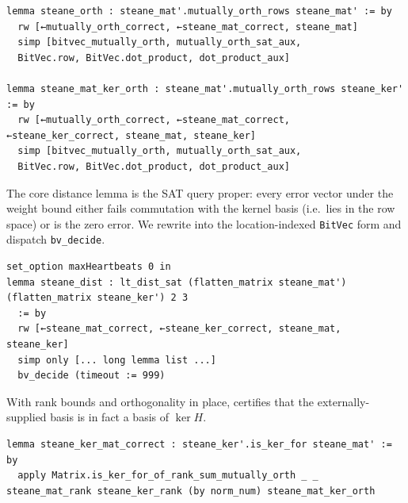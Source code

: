 \begin{lstlisting}
lemma steane_orth : steane_mat'.mutually_orth_rows steane_mat' := by
  rw [←mutually_orth_correct, ←steane_mat_correct, steane_mat]
  simp [bitvec_mutually_orth, mutually_orth_sat_aux,
  BitVec.row, BitVec.dot_product, dot_product_aux]

lemma steane_mat_ker_orth : steane_mat'.mutually_orth_rows steane_ker' := by
  rw [←mutually_orth_correct, ←steane_mat_correct, ←steane_ker_correct, steane_mat, steane_ker]
  simp [bitvec_mutually_orth, mutually_orth_sat_aux,
  BitVec.row, BitVec.dot_product, dot_product_aux]
\end{lstlisting}

%

The core distance lemma is the SAT query proper: every error vector under the
weight bound either fails commutation with the kernel basis (i.e.\ lies in the
row space) or is the zero error. We rewrite into the location-indexed
\lstinline{BitVec} form and dispatch \lstinline{bv_decide}.

\begin{lstlisting}
set_option maxHeartbeats 0 in
lemma steane_dist : lt_dist_sat (flatten_matrix steane_mat') (flatten_matrix steane_ker') 2 3
  := by
  rw [←steane_mat_correct, ←steane_ker_correct, steane_mat, steane_ker]
  simp only [... long lemma list ...]
  bv_decide (timeout := 999)
\end{lstlisting}

%

With rank bounds and orthogonality in place,  certifies that the
externally-supplied basis is in fact a basis of $\ker H$.

\begin{lstlisting}
lemma steane_ker_mat_correct : steane_ker'.is_ker_for steane_mat' := by
  apply Matrix.is_ker_for_of_rank_sum_mutually_orth _ _ steane_mat_rank steane_ker_rank (by norm_num) steane_mat_ker_orth
\end{lstlisting}

%

